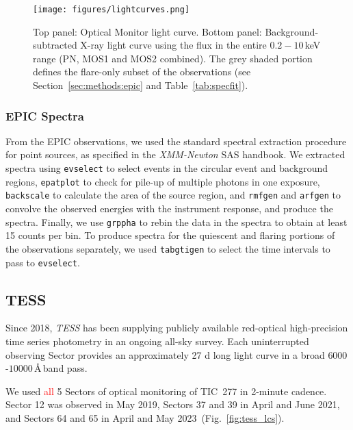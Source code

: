 \documentclass[twocolumn]{aastex631}
\begin{document}
\begin{figure*}[ht!]
    \begin{centering}
        \texttt{[image: figures/lightcurves.png]}
        \caption{
         Top panel: Optical Monitor light curve. Bottom panel: Background-subtracted X-ray light curve using the flux in the entire $0.2-10\,$keV range  (PN, MOS1 and MOS2 combined). The grey shaded portion defines the flare-only subset of the observations (see Section~\ref{sec:methods:epic} and Table~\ref{tab:specfit}).
        }
        \label{fig:lightcurves}
    \end{centering}
\end{figure*}


\subsubsection{EPIC Spectra}
From the EPIC observations, we used the standard spectral extraction procedure for point sources, as specified in the \textit{XMM-Newton} SAS handbook. We extracted spectra using \texttt{evselect} to select events in the circular event and background regions, \texttt{epatplot} to check for pile-up of multiple photons in one exposure, \texttt{backscale} to calculate the area of the source region, and \texttt{rmfgen} and \texttt{arfgen} to convolve the observed energies with the instrument response, and produce the spectra. Finally, we use \texttt{grppha} to rebin the data in the spectra to obtain at least 15 counts per bin. To produce spectra for the quiescent and flaring portions of the observations separately, we used \texttt{tabgtigen} to select the time intervals to pass to \texttt{evselect}.

\subsection{TESS}
\label{sec:obs:tess}
Since 2018, \textit{TESS} has been supplying publicly available red-optical high-precision time series photometry in an ongoing all-sky survey. Each uninterrupted observing Sector provides an approximately 27 d long light curve in a broad $6000$-$10000\,$\AA\,band pass. 

We used \textcolor{red}{all} 5 Sectors of optical monitoring of TIC~277 in 2-minute cadence. Sector 12 was observed in May 2019, Sectors 37 and 39 in April and June 2021, and Sectors 64 and 65 in April and May 2023~(Fig.~\ref{fig:tess_lcs}). 
\end{document}
